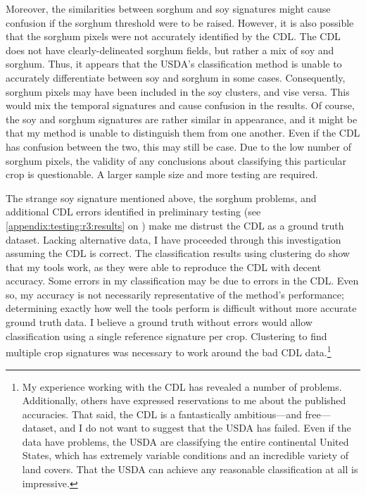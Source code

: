 Moreover, the similarities between sorghum and soy signatures might cause confusion if the sorghum threshold were to be raised. However, it is also possible that the sorghum pixels were not accurately identified by the CDL. The CDL does not have clearly-delineated sorghum fields, but rather a mix of soy and sorghum. Thus, it appears that the USDA’s classification method is unable to accurately differentiate between soy and sorghum in some cases. Consequently, sorghum pixels may have been included in the soy clusters, and vise versa. This would mix the temporal signatures and cause confusion in the results. Of course, the soy and sorghum signatures are rather similar in appearance, and it might be that my method is unable to distinguish them from one another. Even if the CDL has confusion between the two, this may still be case. Due to the low number of sorghum pixels, the validity of any conclusions about classifying this particular crop is questionable. A larger sample size and more testing are required.

The strange soy signature mentioned above, the sorghum problems, and additional CDL errors identified in preliminary testing (see \autoref{appendix:testing:r3:results} on ) make me distrust the CDL as a ground truth dataset. Lacking alternative data, I have proceeded through this investigation assuming the CDL is correct. The classification results using clustering do show that my tools work, as they were able to reproduce the CDL with decent accuracy. Some errors in my classification may be due to errors in the CDL. Even so, my accuracy is not necessarily representative of the method's performance; determining exactly how well the tools perform is difficult without more accurate ground truth data. I believe a ground truth without errors would allow classification using a single reference signature per crop. Clustering to find multiple crop signatures was necessary to work around the bad CDL data.\footnote{My experience working with the CDL has revealed a number of problems. Additionally, others have expressed reservations to me about the published accuracies. That said, the CDL is a fantastically ambitious---and free---dataset, and I do not want to suggest that the USDA has failed. Even if the data have problems, the USDA are classifying the entire continental United States, which has extremely variable conditions and an incredible variety of land covers. That the USDA can achieve any reasonable classification at all is impressive.} 


